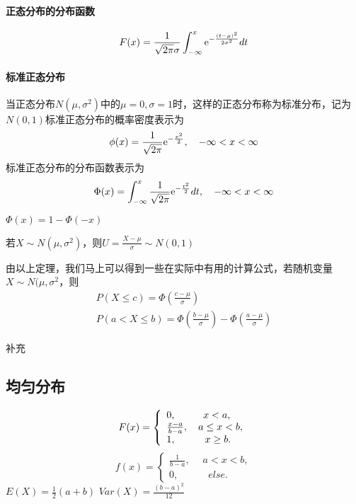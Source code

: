 \paragraph{正态分布的分布函数}
$$F(x) = \frac{1}{{\sqrt {2{\rm{\pi }}} \sigma }}\int_{ - \infty }^x {{{\rm{e}}^{ - \frac{{{{(t - \mu )}^2}}}{{2{\sigma ^2}}}}}} dt$$

\paragraph{标准正态分布}
当正态分布$N(\mu,\sigma^2)$中的$\mu=0,\sigma=1$时，这样的正态分布称为标准分布，记为$N(0,1)$标准正态分布的概率密度表示为
$$\phi (x) = \frac{1}{{\sqrt {2\pi } }}{{\rm{e}}^{ - \frac{{{x^2}}}{2}}},\quad  - \infty  < x < \infty$$
标准正态分布的分布函数表示为
$$\Phi (x) = \int_{ - \infty }^x {\frac{1}{{\sqrt {2{\rm{\pi }}} }}{{\rm{e}}^{ - \frac{{{t^2}}}{2}}}dt} ,\quad  - \infty  < x < \infty $$

$\Phi(x)=1-\Phi(-x)$
\begin{theorem}
    若$X\sim N(\mu ,{\sigma ^2})$，则$U = \frac{{X - \mu }}{\sigma }\sim N(0,1)$
\end{theorem}
由以上定理，我们马上可以得到一些在实际中有用的计算公式，若随机变量$X \sim N(\mu,\sigma^2$，则
$$
    \begin{array}{l}
        P(X \leq c)=\Phi(\frac{c-\mu}{\sigma}) \\
        P(a < X \leq b)=\Phi(\frac{b-\mu}{\sigma})-\Phi(\frac{a-\mu}{\sigma})
    \end{array}
$$

补充

\subsection{均匀分布}
$$F(x) = \left\{ \begin{array}{l}
        0,\quad \quad \;\;{\kern 1pt} {\kern 1pt} x < a, \\
        \frac{{x - a}}{{b - a}},\quad a \le x < b,       \\
        1,\quad \quad \;\;\,{\kern 1pt} {\kern 1pt} x \ge b.
    \end{array} \right.$$
$$f(x) = \left\{ \begin{array}{l}
        \frac{1}{{b - a}},\quad \;a < x < b, \\
        0,\quad \quad \quad else.
    \end{array} \right.$$
$E(X)=\frac{1}{2}(a + b)$
$Var(X)=\frac{{{{(b - a)}^2}}}{{12}}$

